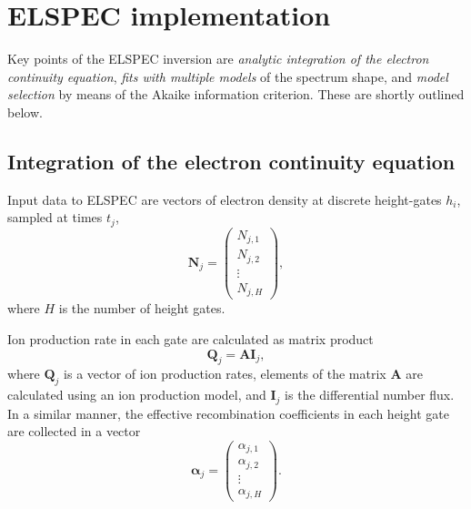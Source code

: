 \documentclass[12pt,a4paper]{report}
\begin{document}
\section{ELSPEC implementation}

Key points of the ELSPEC inversion are \emph{analytic integration of the electron continuity equation}, \emph{fits with multiple models} of the spectrum shape, and \emph{model selection} by means of the Akaike information criterion. These are shortly outlined below. 

\subsection{Integration of the electron continuity equation}

Input data to ELSPEC are vectors of electron density at discrete height-gates $h_i$, sampled at times $t_j$, 
\begin{equation}
\bm{N}_j = \left(
\begin{array}{c}
N_{j,1}\\
N_{j,2}\\
\vdots \\
N_{j,H}
\end{array}
\right),
\end{equation}
where $H$ is the number of height gates. 

Ion production rate in each gate are calculated as matrix product
\begin{equation}
\bm{Q}_j = \bm{A}\bm{I}_j,
\end{equation}
where $\bm{Q}_j$ is a vector of ion production rates, elements of the matrix $\bm{A}$ are calculated using an ion production model, and $\bm{I}_j$ is the differential number flux. In a similar manner, the effective recombination coefficients in each height gate are collected in a vector
\begin{equation}
\bm{\alpha}_j = \left(
\begin{array}{c}
\alpha_{j,1}\\
\alpha_{j,2}\\
\vdots\\
\alpha_{j,H}
\end{array}
\right).
\end{equation}
\end{document}
